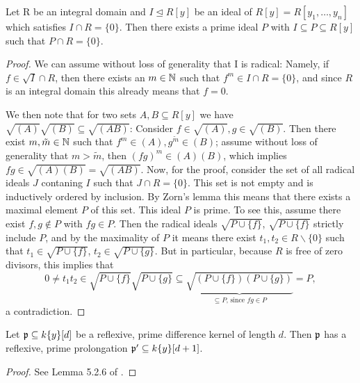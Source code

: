 \begin{lem}\label{primeoverp1}
Let R be an integral domain and $I \unlhd R[y]$ be an ideal of $R[y] = R[y_1,\ldots,y_n]$ which satisfies $I \cap R = \{ 0 \}$.
Then there exists a prime ideal $P$ with $I \subseteq P \subseteq R[y] $ such that $P \cap R = \{0\}$.
\begin{proof}
We can assume without loss of generality that I is radical:
Namely, if $f \in \sqrt{I} \cap R$, then there exists an $m \in \mathbb{N}$ such that $f^m \in I \cap R = \{0\}$, and since $R$ is an integral domain this already means that $f = 0$. 

We then note that for two sets $A,B \subseteq R[y]$ we have $\sqrt{(A)}\sqrt{(B)} \subseteq \sqrt{(AB)}$: Consider $f \in \sqrt{(A)}, g \in \sqrt{(B)}$. Then there exist $m, \tilde m \in \mathbb{N}$ such that $f^m \in (A), g^{\tilde m} \in (B)$;
 assume without loss of generality that $m > \tilde m$, then $(fg)^m \in (A)(B)$, which implies $fg \in \sqrt{(A)(B)} = \sqrt{(AB)}$.
Now, for the proof, consider the set of all radical ideals $J$ contaning $I$ such that $J \cap R = \{0\}$. This set is not empty and is inductively ordered by inclusion.
By Zorn's lemma this means that there exists a maximal element $P$ of this set. This ideal $P$ is prime. To see this, assume there exist $f,g \notin P$ with $fg \in P$. 
Then the radical ideals $\sqrt{P \cup \{f\}}$, $\sqrt{P \cup \{f\}}$ strictly include $P$, and by the maximality of $P$ it means there exist $t_1, t_2 \in R\backslash\{0\}$ such that
$t_1 \in \sqrt{P \cup \{f\}}$, $t_2 \in \sqrt{P \cup \{g\}}$. But in particular, because $R$ is free of zero divisors, this implies that
 \[0 \neq t_1t_2 \in \sqrt{P \cup \{f\}}\sqrt{P \cup \{g\}} \subseteq  \underbrace{\sqrt{(P \cup \{f\})(P \cup \{g\})}}_{\subseteq P\text{, since }fg \in P} = P, \]
a contradiction.
\end{proof}
\end{lem}

\begin{prop}\label{reflexiveprol}
Let $\mathfrak{p} \subseteq k\{y\}[d]$ be a reflexive, prime difference kernel of length $d$. Then $\mathfrak{p}$ has a reflexive, prime prolongation $\mathfrak{p}' \subseteq k\{y\}[d+1]$.
\begin{proof}
See Lemma 5.2.6 of \cite{wibmer}.
\end{proof}
\end{prop}

